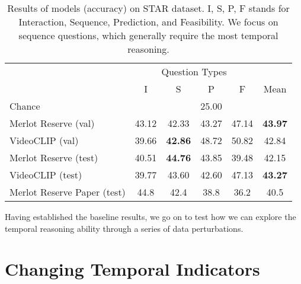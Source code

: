 \begin{table}[tp] 
    \centering 
	\caption{Results of models (accuracy) on STAR dataset. I, S, P, F stands
	for Interaction, Sequence, Prediction, and Feasibility. We focus on
	sequence questions, which generally require the most temporal reasoning.}
    \label{tab:zs_star} 
    \begin{tabular}{lccccc} 
        \toprule
        \multicolumn{1}{c}{}        & \multicolumn{4}{c}{Question Types}                & \multicolumn{1}{c}{} \\
                                      \cmidrule(){2-5}
                                    & I           & S        & P          & F           & Mean \\
        \cmidrule(r){1-1}             \cmidrule(){2-5}                                    \cmidrule(l){6-6}
		Chance						& \multicolumn{5}{c}{25.00} \\
        \cmidrule(r){1-1}             \cmidrule(){2-6}
		Merlot Reserve (val)        & 43.12       & 42.33    & 43.27      & 47.14     & \textbf{43.97} \\
		VideoCLIP (val)             & 39.66       & \textbf{42.86}    & 48.72    & 50.82       & 42.84 \\
        \cmidrule(r){1-1}             \cmidrule(){2-6}
		Merlot Reserve (test)       & 40.51       & \textbf{44.76}    & 43.85    & 39.48       & 42.15 \\  
		VideoCLIP (test)            & 39.77       & 43.60    & 42.60      & 47.13     & \textbf{43.27} \\
        \cmidrule(r){1-1}             \cmidrule(){2-6}
        Merlot Reserve Paper (test) & 44.8        & 42.4     & 38.8       & 36.2        & 40.5 \\
        \bottomrule
    \end{tabular} 
\end{table} 

Having established the baseline results, we go on to test how we can explore
the temporal reasoning ability through a series of data perturbations.


\section{Changing Temporal Indicators}
\label{sec:change_temp}

